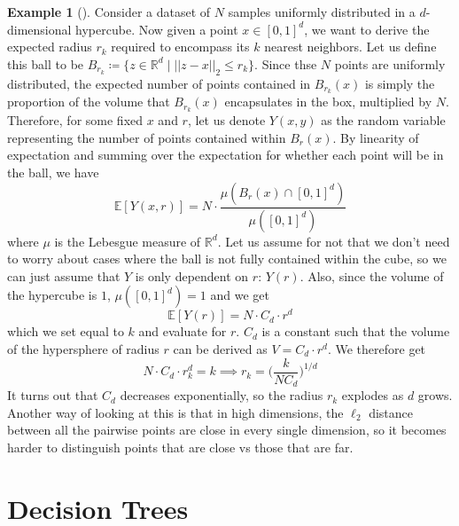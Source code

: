 \documentclass{article}
\theoremstyle{definition}
\newtheorem{example}{Example}[section]
\theoremstyle{remark}
\theoremstyle{definition}
\begin{document}
\begin{example}[]
    Consider a dataset of $N$ samples uniformly distributed in a $d$-dimensional hypercube. Now given a point $x \in [0, 1]^d$, we want to derive the expected radius $r_k$ required to encompass its $k$ nearest neighbors. Let us define this ball to be $B_{r_k} \coloneqq \{ z \in \mathbb{R}^d \mid ||z - x ||_2 \leq r_k \}$. Since thse $N$ points are uniformly distributed, the expected number of points contained in $B_{r_k} (x)$ is simply the proportion of the volume that $B_{r_k} (x)$ encapsulates in the box, multiplied by $N$. Therefore, for some fixed $x$ and $r$, let us denote $Y(x, y)$ as the random variable representing the number of points contained within $B_r (x)$. By linearity of expectation and summing over the expectation for whether each point will be in the ball, we have 
    \[\mathbb{E}[Y (x, r)] = N \cdot \frac{\mu(B_r (x) \cap [0, 1]^d) }{\mu([0, 1]^d)}\]
    where $\mu$ is the Lebesgue measure of $\mathbb{R}^d$. Let us assume for not that we don't need to worry about cases where the ball is not fully contained within the cube, so we can just assume that $Y$ is only dependent on $r$: $Y(r)$. Also, since the volume of the hypercube is $1$,  $\mu([0, 1]^d) = 1$ and we get 
    \[\mathbb{E}[Y(r)] = N \cdot C_d \cdot r^d\]
    which we set equal to $k$ and evaluate for $r$. $C_d$ is a constant such that the volume of the hypersphere of radius $r$ can be derived as $V = C_d \cdot r^d$. We therefore get 
    \[N \cdot C_d \cdot r_k^d = k \implies r_k = \bigg( \frac{k}{N C_d} \bigg)^{1/d}\]
    It turns out that $C_d$ decreases exponentially, so the radius $r_k$ explodes as $d$ grows. Another way of looking at this is that in high dimensions, the $\ell_2$ distance between all the pairwise points are close in every single dimension, so it becomes harder to distinguish points that are close vs those that are far.  
\end{example} 

\section{Decision Trees}
\end{document}
